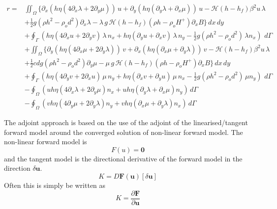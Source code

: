 \documentclass[10pt,a4paper]{book}
\newcommand{\He}{\mathcal{H}}
\newcommand{\p}{\partial}
\begin{document}
\begin{align} 
r=& \iint_{\Omega} \big \{ \p_x ( h \eta ( 4 \p_x \lambda + 2 \p_y \mu ))  \, u +  \p_y ( h \eta (\p_y \lambda + \p_x \mu)) \, u - \He(h-h_f) \beta^2 u \, \lambda \nonumber \\
  &+ \frac{1}{2} g (\rho h^2 - \rho_o d^2) \p_x \lambda   - \lambda \, g\,\He(h-h_f) (\rho h -\rho_o H^{+}) \p_x B \big \}  \, dx \, dy \nonumber \\
  &+ \oint_{\Gamma} (h \eta ( 4\p_x u + 2 \p_y v) \, \lambda \, n_x+  h \eta (\p_y u + \p_x v) \, \lambda \, n_y- \frac{1}{2} g (\rho h^2 - \rho_o d^2) \, \lambda n_x)\,\, d\Gamma \nonumber \\
  &+\iint_{\Omega} \big \{  \p_y ( h \eta ( 4 \p_x \mu + 2 \p_y \lambda )) \, v +   \p_x ( h \eta (\p_x \mu + \p_y \lambda)) \, v - \He(h-h_f) \beta^2 u \, \lambda \nonumber \\
  &+ \frac{1}{2} cdg (\rho h^2 - \rho_o d^2) \p_y \mu   - \mu \, g\,\He(h-h_f) (\rho h -\rho_o H^{+}) \p_x B \big \} \, dx \, dy \nonumber \\
  &+ \oint_{\Gamma} (h \eta ( 4\p_y v + 2 \p_x u) \, \mu \, n_y +  h \eta (\p_x v + \p_y u) \, \mu \, n_x- \frac{1}{2} g (\rho h^2 - \rho_o d^2) \, \mu n_y )\, \, d\Gamma \nonumber \\
  &-\oint_{\Omega} (u h \eta ( 4 \p_x \lambda + 2 \p_y \mu )  n_x +  u  h \eta (\p_y \lambda + \p_x \mu) n_y )\,d\Gamma \nonumber \\
  &-\oint_{\Omega} (v h \eta ( 4 \p_y \mu + 2 \p_y \lambda )  n_y +  v  h \eta (\p_x \mu + \p_y \lambda)  n_x )\, d\Gamma \nonumber 
\end{align}

The adjoint approach is based on the use of the adjoint of the
linearised/tangent forward model around the converged solution of non-linear
forward model.  The non-linear forward model is 
\[ F(u)=\bm{0} \] and the tangent model is the directional
derivative of the forward model in the direction $\delta \bm{u}$.
\[
K=D \bm{F}(\bm{u})[\delta \bm{u}]
\]
Often this is simply be written as
\[
K=\frac{\p \bm{F}}{\p {\bm{u}}}
\]
\end{document}
